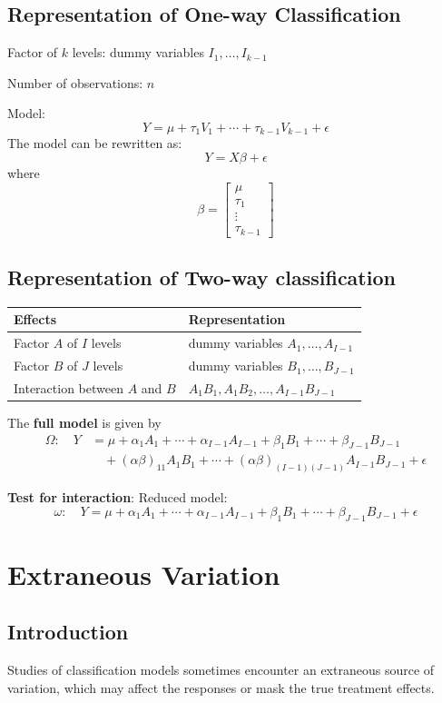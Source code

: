 \documentclass[11pt,a4paper]{article}
\begin{document}
\subsection{Representation of One-way Classification}
Factor of $k$ levels: dummy variables $I_1, \dots, I_{k-1}$ \par
Number of observations: $n$ \par
Model:
\[
Y = \mu + \tau_1 V_1 + \cdots + \tau_{k-1} V_{k-1} + \epsilon
\]
The model can be rewritten as:
\[
Y = X \beta + \epsilon
\]
where
\[
\beta = 
\begin{bmatrix}
\mu \\
\tau_1 \\
\vdots \\
\tau_{k-1}
\end{bmatrix}
\]

\subsection{Representation of Two-way classification}
\begin{tabular}{ll}
    \textbf{Effects} & \textbf{Representation} \\
    \hline
    Factor $A$ of $I$ levels & dummy variables $A_1, \dots, A_{I-1}$ \\
    Factor $B$ of $J$ levels & dummy variables $B_1, \dots, B_{J-1}$ \\
    Interaction between $A$ and $B$ & $A_1 B_1, A_1 B_2, \dots, A_{I-1} B_{J-1}$ \\
\end{tabular}

The \textbf{full model} is given by
\begin{align*}
\Omega: \quad Y &= \mu + \alpha_1 A_1 + \cdots + \alpha_{I-1} A_{I-1} + \beta_1 B_1 + \cdots + \beta_{J-1} B_{J-1} \\
&\quad + (\alpha \beta)_{11} A_1 B_1 + \cdots + (\alpha \beta)_{(I-1)(J-1)} A_{I-1} B_{J-1} + \epsilon
\end{align*}

\textbf{Test for interaction}:
Reduced model:
\[
\omega: \quad Y = \mu + \alpha_1 A_1 + \cdots + \alpha_{I-1} A_{I-1} + \beta_1 B_1 + \cdots + \beta_{J-1} B_{J-1} + \epsilon
\]

\section{Extraneous Variation}
\subsection{Introduction}
Studies of classification models sometimes encounter an extraneous source of variation, which may affect the responses or mask the true treatment effects. \par
\end{document}
